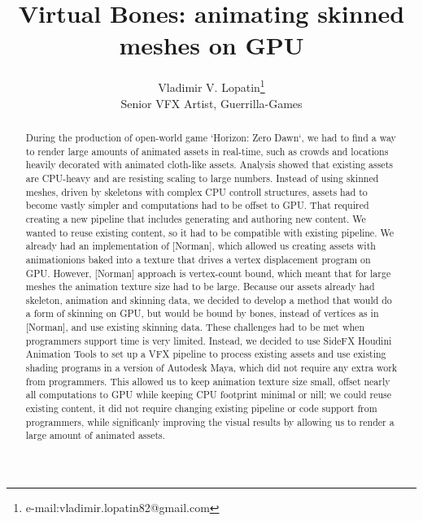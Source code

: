 \documentclass{acmsiggraph}
\title{Virtual Bones: animating skinned meshes on GPU}
\author{Vladimir V. Lopatin\thanks{e-mail:vladimir.lopatin82@gmail.com}\\Senior VFX Artist, Guerrilla-Games}
\begin{document}


\maketitle

\begin{abstract}
  During the production of open-world game ‘Horizon: Zero Dawn‘, we had to find a way to render large amounts of animated assets in real-time, such as crowds and locations heavily decorated with animated cloth-like assets. Analysis showed that existing assets are CPU-heavy and are resisting scaling to large numbers. Instead of using skinned meshes, driven by skeletons with complex CPU controll structures, assets had to become vastly simpler and computations had to be offset to GPU. That required creating a new pipeline that includes generating and authoring new content. We wanted to reuse existing content, so it had to be compatible with existing pipeline. We already had an implementation of [Norman], which allowed us creating assets with animationions baked into a texture that drives a vertex displacement program on GPU. However, [Norman] approach is vertex-count bound, which meant that for large meshes the animation texture size had to be large. Because our assets already had skeleton, animation and skinning data, we decided to develop a method that would do a form of skinning on GPU, but would be bound by bones, instead of vertices as in [Norman], and use existing skinning data. These challenges had to be met when programmers support time is very limited. Instead, we decided to use SideFX Houdini Animation Tools to set up a VFX pipeline to process existing assets and use existing shading programs in a version of Autodesk Maya, which did not require any extra work from programmers. This allowed us to keep animation texture size small, offset nearly all computations to GPU while keeping CPU footprint minimal or nill; we could reuse existing content, it did not require changing existing pipeline or code support from programmers, while significanly improving the visual results by allowing us to render a large amount of animated assets.
\end{abstract}
\end{document}

